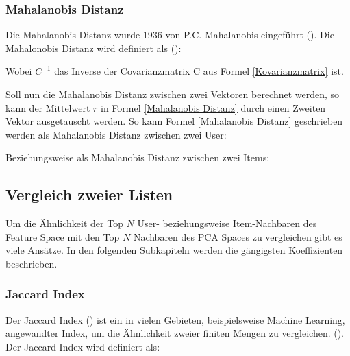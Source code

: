 

\subsubsection{Mahalanobis Distanz}
Die Mahalanobis Distanz wurde 1936 von P.C. Mahalanobis eingeführt (\cite{mahalanobis1936generalized}).
Die Mahalonobis Distanz wird definiert als (\cite{DEMAESSCHALCK20001}):

Wobei $C^{-1}$ das Inverse der Covarianzmatrix C aus Formel  \ref{Kovarianzmatrix} ist.

Soll nun die Mahalanobis Distanz zwischen zwei Vektoren berechnet werden, so kann der Mittelwert $\bar{r}$ in Formel \ref{Mahalanobis Distanz} durch einen Zweiten Vektor ausgetauscht werden. So kann Formel \ref{Mahalanobis Distanz} geschrieben werden als Mahalanobis Distanz zwischen zwei User:


Beziehungsweise als Mahalanobis Distanz zwischen zwei Items:



\subsection{Vergleich zweier Listen}
Um die Ähnlichkeit der Top $N$ User- beziehungsweise Item-Nachbaren des Feature Space mit den Top $N$ Nachbaren des PCA Spaces zu vergleichen gibt es viele Ansätze. In den folgenden Subkapiteln werden die gängigsten Koeffizienten beschrieben. 
\subsubsection{Jaccard Index}
Der Jaccard Index (\cite{Jaccard}) ist ein in vielen Gebieten, beispielsweise Machine Learning, angewandter Index, um die Ähnlichkeit zweier finiten Mengen zu vergleichen. (\cite{kotz_balakrishnan_vidakovic_campbell}). Der Jaccard Index wird definiert als: 


